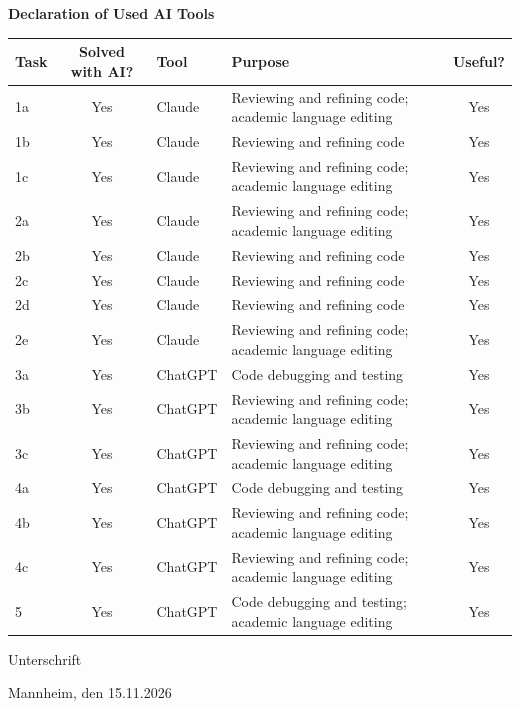 \begin{center}
  \textbf{Declaration of Used AI Tools} \\[.3em]
  \begin{tabularx}{\textwidth}{lclXc}
    \toprule
    Task & Solved with AI? & Tool & Purpose & Useful? \\
    \midrule
    1a & Yes & Claude & Reviewing and refining code; academic language editing & Yes \\
    1b & Yes & Claude & Reviewing and refining code & Yes \\
    1c & Yes & Claude & Reviewing and refining code; academic language editing & Yes \\
    2a & Yes & Claude & Reviewing and refining code; academic language editing & Yes \\
    2b & Yes & Claude & Reviewing and refining code & Yes \\
    2c & Yes & Claude & Reviewing and refining code & Yes \\
    2d & Yes & Claude & Reviewing and refining code & Yes \\
    2e & Yes & Claude & Reviewing and refining code; academic language editing & Yes \\
    3a & Yes & ChatGPT & Code debugging and testing & Yes \\
    3b & Yes & ChatGPT & Reviewing and refining code; academic language editing & Yes \\
    3c & Yes & ChatGPT & Reviewing and refining code; academic language editing & Yes \\
    4a & Yes & ChatGPT & Code debugging and testing & Yes \\
    4b & Yes & ChatGPT & Reviewing and refining code; academic language editing & Yes \\
    4c & Yes & ChatGPT & Reviewing and refining code; academic language editing & Yes \\
    5 & Yes & ChatGPT & Code debugging and testing; academic language editing & Yes \\
    \bottomrule
  \end{tabularx}
\end{center}

\vspace{1cm}
\noindent Unterschrift\par
\vspace{0.65cm}
\nopagebreak[4]
\noindent Mannheim, den 15.11.2026 \hfill
